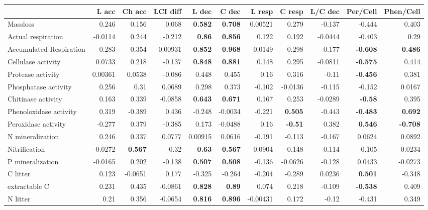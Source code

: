 \documentclass[10pt]{article}
\begin{document}
\begin{flushleft}
\begin{landscape}
\begin{table}[h!]
\begin{center}
{\begin{tabular}{lrrrrrrrrrr}
  \hline
 & L acc & Ch acc & LCI diff & L dec & C dec & L resp & C resp & L/C dec & Per/Cell & Phen/Cell \\ 
  \hline
Massloss & 0.246 & 0.156 & 0.068 & \textbf{0.582} & \textbf{0.708} & 0.00521 & 0.279 & -0.137 & -0.444 & 0.403 \\ 
  Actual respiration & -0.0114 & 0.244 & -0.212 & \textbf{0.86} & \textbf{0.856} & 0.122 & 0.192 & -0.0444 & -0.403 & 0.29 \\ 
  Accumulated Respiration & 0.283 & 0.354 & -0.00931 & \textbf{0.852} & \textbf{0.968} & 0.0149 & 0.298 & -0.177 & \textbf{-0.608} & \textbf{0.486} \\ 
  Cellulase activity & 0.0733 & 0.218 & -0.137 & \textbf{0.848} & \textbf{0.881} & 0.148 & 0.295 & -0.0811 & \textbf{-0.575} & 0.414 \\ 
  Protease activity & 0.00361 & 0.0538 & -0.086 & 0.448 & 0.455 & 0.16 & 0.316 & -0.11 & \textbf{-0.456} & 0.381 \\ 
  Phosphatase activity & 0.256 & 0.31 & 0.0689 & 0.298 & 0.373 & -0.102 & -0.0136 & -0.115 & -0.152 & 0.0167 \\ 
  Chitinase activity & 0.163 & 0.339 & -0.0858 & \textbf{0.643} & \textbf{0.671} & 0.167 & 0.253 & -0.0289 & \textbf{-0.58} & 0.395 \\ 
  Phenoloxidase activity & 0.319 & -0.389 & 0.436 & -0.248 & -0.0034 & -0.221 & \textbf{0.505} & -0.443 & \textbf{-0.483} & \textbf{0.692} \\ 
  Peroxidase activity & -0.277 & 0.379 & -0.385 & 0.173 & -0.0488 & 0.16 & \textbf{-0.51} & 0.382 & \textbf{0.546} & \textbf{-0.708} \\ 
  N mineralization & 0.246 & 0.337 & 0.0777 & 0.00915 & 0.0616 & -0.191 & -0.113 & -0.167 & 0.0624 & 0.0892 \\ 
  Nitrification & -0.0272 & \textbf{0.567} & -0.32 & \textbf{0.63} & \textbf{0.567} & 0.0904 & -0.148 & 0.114 & -0.105 & -0.0234 \\ 
  P mineralization & -0.0165 & 0.202 & -0.138 & \textbf{0.507} & \textbf{0.508} & -0.136 & -0.0626 & -0.128 & 0.0433 & -0.0273 \\ 
  C litter & 0.123 & -0.0651 & 0.177 & -0.325 & -0.264 & -0.204 & -0.289 & 0.0236 & \textbf{0.501} & -0.348 \\ 
  extractable C & 0.231 & 0.435 & -0.0861 & \textbf{0.828} & \textbf{0.89} & 0.074 & 0.218 & -0.109 & \textbf{-0.538} & 0.409 \\ 
  N litter & 0.21 & 0.356 & -0.0654 & \textbf{0.816} & \textbf{0.896} & -0.00431 & 0.172 & -0.12 & -0.431 & 0.349 \\ 

\end{tabular}}
\end{center}
\end{table}
\end{landscape}
\end{flushleft}
\end{document}
